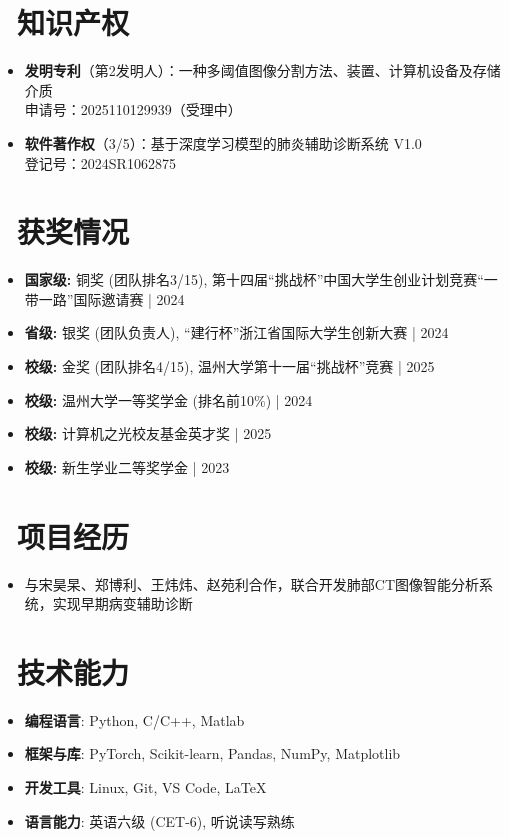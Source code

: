 \documentclass{resume}
\begin{document}
\section{\faKey\ 知识产权}
\begin{itemize}
  \item \textbf{发明专利}（第2发明人）：一种多阈值图像分割方法、装置、计算机设备及存储介质\\
  申请号：2025110129939（受理中）
  \item \textbf{软件著作权}（3/5）：基于深度学习模型的肺炎辅助诊断系统 V1.0\\
  登记号：2024SR1062875
\end{itemize}

\section{\faTrophy\ 获奖情况}
\begin{itemize}[parsep=0.5ex]
  \item \textbf{国家级:} 铜奖 (团队排名3/15), 第十四届“挑战杯”中国大学生创业计划竞赛“一带一路”国际邀请赛 | 2024
  \item \textbf{省级:} 银奖 (团队负责人), “建行杯”浙江省国际大学生创新大赛 | 2024
  \item \textbf{校级:} 金奖 (团队排名4/15), 温州大学第十一届“挑战杯”竞赛 | 2025
  \item \textbf{校级:} 温州大学一等奖学金 (排名前10\%) | 2024
  \item \textbf{校级:} 计算机之光校友基金英才奖 | 2025
  \item \textbf{校级:} 新生学业二等奖学金 | 2023
\end{itemize}

\section{\faUsers\ 项目经历}
\begin{itemize}
  \item 与宋昊杲、郑博利、王炜炜、赵苑利合作，联合开发肺部CT图像智能分析系统，实现早期病变辅助诊断
\end{itemize}

\section{\faCogs\ 技术能力}
\begin{itemize}[parsep=0.5ex]
  \item \textbf{编程语言}: Python, C/C++, Matlab
  \item \textbf{框架与库}: PyTorch, Scikit-learn, Pandas, NumPy, Matplotlib  
  \item \textbf{开发工具}: Linux, Git, VS Code, LaTeX
  \item \textbf{语言能力}: 英语六级 (CET-6), 听说读写熟练
\end{itemize}
\end{document}
